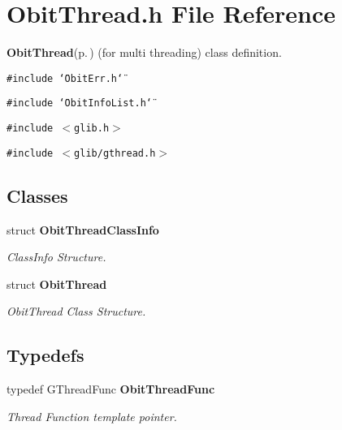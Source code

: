 \section{Obit\-Thread.h File Reference}
\label{ObitThread_8h}
{\bf Obit\-Thread}{\rm (p.\,\pageref{structObitThread})} (for multi threading) class definition. 

{\tt \#include \char`\"{}Obit\-Err.h\char`\"{}}\par
{\tt \#include \char`\"{}Obit\-Info\-List.h\char`\"{}}\par
{\tt \#include $<$glib.h$>$}\par
{\tt \#include $<$glib/gthread.h$>$}\par
\subsection*{Classes}
\begin{CompactItemize}
\item 
struct {\bf Obit\-Thread\-Class\-Info}
\begin{CompactList}\small\item\em Class\-Info Structure. \item\end{CompactList}\item 
struct {\bf Obit\-Thread}
\begin{CompactList}\small\item\em Obit\-Thread Class Structure. \item\end{CompactList}\end{CompactItemize}
\subsection*{Typedefs}
\begin{CompactItemize}
\item 
typedef GThread\-Func {\bf Obit\-Thread\-Func}
\begin{CompactList}\small\item\em Thread Function template pointer. \item\end{CompactList}\end{CompactItemize}
